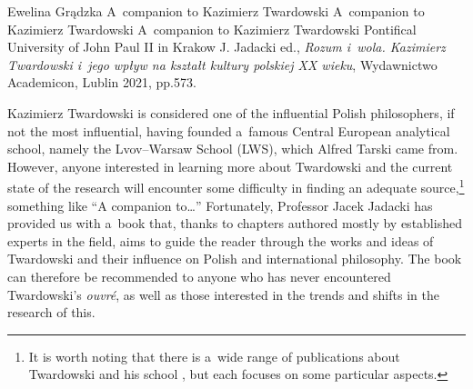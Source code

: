 \begin{newrevengenv}{Ewelina Grądzka}
	{A~companion to Kazimierz Twardowski}
	{A~companion to Kazimierz Twardowski}
	{A~companion to Kazimierz Twardowski}
	{Pontifical University of John Paul II in Krakow}
	{J. Jadacki ed., \textit{Rozum i~wola. Kazimierz Twardowski i~jego wpływ na kształt kultury polskiej XX wieku}, Wydawnictwo Academicon, Lublin 2021, pp.573.}




Kazimierz Twardowski is considered one of the influential Polish philosophers, if not the most influential, having founded a~famous Central European analytical school, namely the Lvov–Warsaw School (LWS), which Alfred Tarski came from. However, anyone interested in learning more about Twardowski and the current state of the research will encounter some difficulty in finding an adequate source,\footnote{It is worth noting that there is a~wide range of publications about Twardowski and his school
\parencites[e.g.,][]{wolenski_filozoficzna_1985}{wolenski_logic_1989}{poli_polish_1993}{brandl_actions_1999}{chybinska_tradition_2016}{brozek_significance_2017}{drabarek_interdisciplinary_2019},
but each focuses on some particular aspects. } something like ``A companion to…'' Fortunately, Professor Jacek Jadacki has provided us with a~book that, thanks to chapters authored mostly by established experts in the field, aims to guide the reader through the works and ideas of Twardowski and their influence on Polish and international philosophy. The book can therefore be recommended to anyone who has never encountered Twardowski's \textit{ouvré}, as well as those interested in the trends and shifts in the research of this.


\end{newrevengenv}
